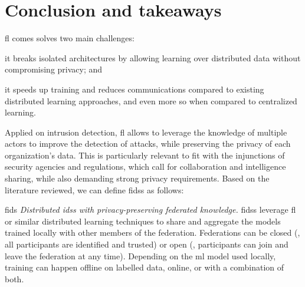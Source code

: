 \section{Conclusion and takeaways\label{sec:sota.conclusion}}

\Gls{fl} comes solves two main challenges: 
\begin{enumerate*}[(1)]
    \item it breaks isolated architectures by allowing learning over distributed data without compromising privacy; and
    \item it speeds up training and reduces communications compared to existing distributed learning approaches, and even more so when compared to centralized learning.
\end{enumerate*}
Applied on intrusion detection, \gls{fl} allows to leverage the knowledge of multiple actors to improve the detection of attacks, while preserving the privacy of each organization's data.
This is particularly relevant to fit with the injunctions of security agencies and regulations, which call for collaboration and intelligence sharing, while also demanding strong privacy requirements.
Based on the literature reviewed, we can define \glspl{fids} as follows:

\begin{definitionbox}{}{fids}
  \emph{Distributed \glspl{ids} with privacy-preserving federated knowledge.}
  \Glspl{fids} leverage \gls{fl} or similar distributed learning techniques\footnotemark{} to share and aggregate the models trained locally with other members of the federation.
  Federations can be closed (\ie, all participants are identified and trusted) or open (\ie, participants can join and leave the federation at any time).
  Depending on the \gls{ml} model used locally, training can happen offline on labelled data, online, or with a combination of both.
\end{definitionbox}


